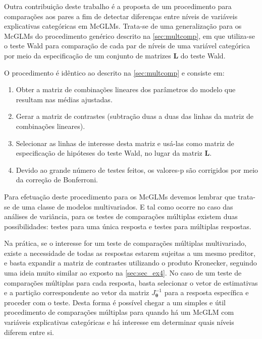 Outra contribuição deste trabalho é a proposta de um procedimento para comparações aos pares a fim de detectar diferenças entre níveis de variáveis explicativas categóricas em McGLMs. Trata-se de uma generalização para os McGLMs do procedimento genérico descrito na \autoref{sec:multcomp}, em que utiliza-se o teste Wald para comparação de cada par de níveis de uma variável categórica por meio da especificação de um conjunto de matrizes $\boldsymbol{L}$ do teste Wald.

O procedimento é idêntico ao descrito na \autoref{sec:multcomp} e consiste em:  

\begin{enumerate}

  \item Obter a matriz de combinações lineares dos parâmetros do modelo que resultam nas médias ajustadas.
  
  \item Gerar a matriz de contrastes (subtração duas a duas das linhas da matriz de combinações lineares).
  
  \item Selecionar as linhas de interesse desta matriz e usá-las como matriz de especificação de hipóteses do teste Wald, no lugar da matriz $\boldsymbol{L}$.
  
  \item Devido ao grande número de testes feitos, os valores-p são corrigidos por meio da correção de Bonferroni.
  
\end{enumerate}

Para efetuação deste procedimento para os McGLMs devemos lembrar que trata-se de uma classe de modelos multivariados. E tal como ocorre no caso das análises de variância, para os testes de comparações múltiplas existem duas possibilidades: testes para uma única resposta e testes para múltiplas respostas. 

Na prática, se o interesse for um teste de comparações múltiplas multivariado, existe a necessidade de todas as respostas estarem sujeitas a um mesmo preditor, e basta expandir a matriz de contrastes utilizando o produto Kronecker, seguindo uma ideia muito similar ao exposto na \autoref{sec:sec_ex4}. No caso de um teste de comparações múltiplas para cada resposta, basta selecionar o vetor de estimativas e a partição correspondente ao vetor da matriz $J_{\boldsymbol{\theta}}^{-1}$ para a resposta específica e proceder com o teste. Desta forma é possível chegar a um simples e útil procedimento de comparações múltiplas para quando há um McGLM com variáveis explicativas categóricas e há interesse em determinar quais níveis diferem entre si.


